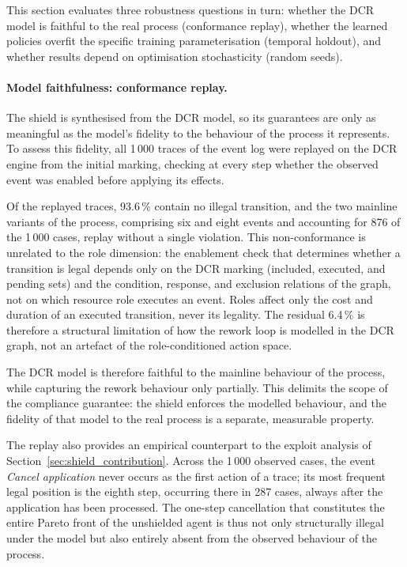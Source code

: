 This section evaluates three robustness questions in turn: whether the
\ac{DCR} model is faithful to the real process (conformance replay),
whether the learned policies overfit the specific training
parameterisation (temporal holdout), and whether results depend on
optimisation stochasticity (random seeds).

\paragraph{Model faithfulness: conformance replay.}

The shield is synthesised from the \ac{DCR} model, so its guarantees
are only as meaningful as the model's fidelity to the behaviour of the
process it represents. To assess this fidelity, all 1\,000 traces of
the event log were replayed on the \ac{DCR} engine from the initial
marking, checking at every step whether the observed event was enabled
before applying its effects.

Of the replayed traces, 93.6\,\% contain no illegal transition, and
the two mainline variants of the process, comprising six and eight
events and accounting for 876 of the 1\,000 cases, replay without a
single violation. This non-conformance is unrelated to the role dimension: the enablement check that determines whether a transition is legal depends only on the \ac{DCR} marking (included, executed, and pending sets) and the condition, response, and exclusion relations of the graph, not on which
resource role executes an event. Roles affect only the cost and duration
of an executed transition, never its legality. The residual 6.4\,\% is
therefore a structural limitation of how the rework loop is modelled in
the \ac{DCR} graph, not an artefact of the role-conditioned action space.

The \ac{DCR} model is therefore faithful to the mainline behaviour of
the process, while capturing the rework behaviour only partially. This
delimits the scope of the compliance guarantee: the shield enforces
the modelled behaviour, and the fidelity of that model to the real
process is a separate, measurable property.

The replay also provides an empirical counterpart to the exploit
analysis of Section~\ref{sec:shield_contribution}. Across the 1\,000
observed cases, the event \textit{Cancel application} never occurs as
the first action of a trace; its most frequent legal position is the
eighth step, occurring there in 287 cases, always after the
application has been processed. The one-step cancellation that
constitutes the entire Pareto front of the unshielded agent is thus
not only structurally illegal under the model but also entirely absent
from the observed behaviour of the process.

